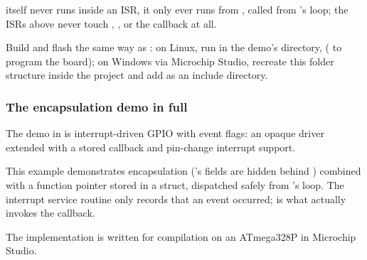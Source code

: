 
\noindent{} itself never runs inside an ISR, it only ever runs from
, called from 's loop; the ISRs above never touch
, , or the callback at all.

Build and flash the same way as : on Linux, run  in the demo's
directory,  ( to program the board); on
Windows via Microchip Studio, recreate this folder structure inside the project and add
 as an include directory.

\subsubsection{The encapsulation demo in full}
The demo in  is interrupt-driven GPIO with event flags: an
opaque  driver extended with a stored callback and pin-change interrupt support.

This example demonstrates encapsulation ('s fields are hidden behind
) combined with a function pointer stored in a struct, dispatched safely from
's loop. The interrupt service routine only records that an event occurred;
 is what actually invokes the callback.

The implementation is written for compilation on an ATmega328P in Microchip Studio.

